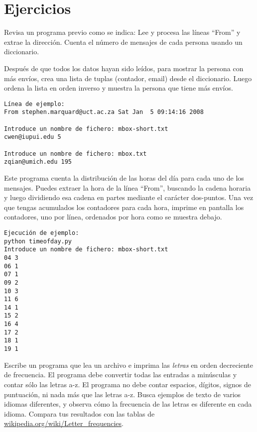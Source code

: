 \section{Ejercicios}

\begin{ex}
Revisa un programa previo como se indica: Lee y
procesa las líneas ``From'' y extrae la
dirección. Cuenta el número de
mensajes de cada persona usando un diccionario.
	
Después de que todos los datos hayan sido leídos, para mostrar
la persona con más envíos, crea
una lista de tuplas (contador, email) desde el
diccionario. Luego ordena la lista en orden
inverso y muestra la persona que tiene más
envíos.

\beforeverb
\begin{verbatim}
Línea de ejemplo:
From stephen.marquard@uct.ac.za Sat Jan  5 09:14:16 2008

Introduce un nombre de fichero: mbox-short.txt
cwen@iupui.edu 5

Introduce un nombre de fichero: mbox.txt
zqian@umich.edu 195
\end{verbatim}
\afterverb
\end{ex}
\begin{ex}
Este programa cuenta la distribución de las horas del día para
cada uno de los mensajes. Puedes extraer la hora de la línea
``From'', buscando la cadena horaria y luego dividiendo esa cadena
en partes mediante el carácter dos-puntos. Una vez que tengas acumulados
los contadores para cada hora, imprime en pantalla los contadores, uno por línea,
ordenados por hora como se muestra debajo.
\beforeverb
\begin{verbatim}
Ejecución de ejemplo:
python timeofday.py
Introduce un nombre de fichero: mbox-short.txt
04 3
06 1
07 1
09 2
10 3
11 6
14 1
15 2
16 4
17 2
18 1
19 1
\end{verbatim}
\afterverb
\end{ex}


\begin{ex}
Escribe un programa que lea un archivo e
imprima las {\em letras} en orden decreciente de frecuencia. El programa
debe convertir todas las entradas a minúsculas y contar sólo las letras a-z.
El programa no debe contar espacios, dígitos, signos de puntuación, ni nada
más que las letras a-z.
Busca ejemplos de texto de varios idiomas diferentes, y observa cómo la frecuencia
de las letras es diferente en cada idioma. Compara tus resultados con las tablas de
\url{wikipedia.org/wiki/Letter_frequencies}.


\end{ex}

